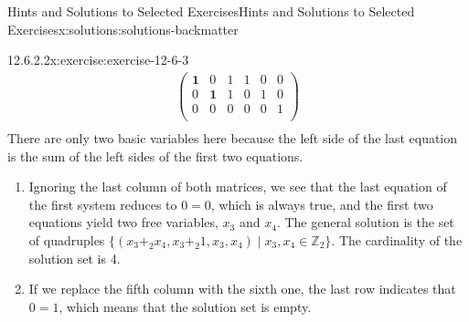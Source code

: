 \documentclass[oneside,10pt,]{book}
\newcommand{\blocktitlefont}{\relax}
\numberwithin{equation}{section}
\begin{document}
\begin{solutions-chapter}{Hints and Solutions to Selected Exercises}{}{Hints and Solutions to Selected Exercises}{}{}{x:solutions:solutions-backmatter}
\begin{divisionsolution}{12.6.2.2}{}{x:exercise:exercise-12-6-3}
\begin{equation*}
\begin{split}
\left(
\begin{array}{cccc|cc}
\textbf{1} & 0  & 1 &  1 & 0 & 0 \\
0 & \textbf{1}  & 1 &  0 & 1 & 0  \\
0 & 0                & 0 &  0 & 0 & 1  \\
\end{array}
\right)\\
\end{split}
\end{equation*}
There are only two basic variables here because the left side of the last equation is the sum of the  left sides of the first two equations.%
\begin{enumerate}[label=(\alph*)]
\item{}Ignoring the last column of both matrices, we see that the last equation of the first system reduces to \(0=0\), which is always true, and the first two equations yield two free variables, \(x_3\) and \(x_4\).  The general solution is the set of quadruples \(\{(x_3 +_2 x_4,x_3 +_2 1, x_3, x_4) \mid x_3, x_4 \in \mathbb{Z}_2 \}\).  The cardinality of the solution set is 4.%
\item{}If we replace the fifth column with the sixth one, the last row indicates that \(0=1\), which means that the solution set is empty.%
\end{enumerate}
%
\end{divisionsolution}%
\end{solutions-chapter}
\end{document}

